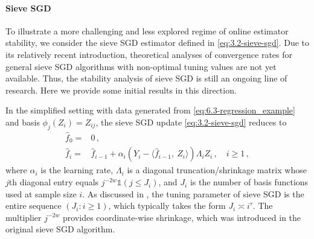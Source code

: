 \documentclass[11pt]{article}
\theoremstyle{plain}
\newcommand{\D}{{\mathcal{D}}}
\begin{document}

\paragraph{Sieve SGD}
To illustrate a more challenging and less explored regime of online estimator stability, we 
consider the sieve SGD estimator defined in \eqref{eq:3.2-sieve-sgd}.  Due to its relatively recent introduction, theoretical analyses of convergence rates for general sieve SGD algorithms with non-optimal tuning values are not yet available. Thus, the stability analysis of sieve SGD is still an ongoing line of research.  Here we provide some initial results in this direction.

In the
simplified setting with data generated from \eqref{eq:6.3-regression_example} and basis $\phi_j(Z_i)=Z_{ij}$, the sieve SGD update \eqref{eq:3.2-sieve-sgd} reduces to
\begin{align}
    \hat f_0 = &0\,,\nonumber\\
    \hat f_{i} = & \hat f_{i-1} + \alpha_i (Y_i-\langle \hat f_{i-1},~Z_i\rangle) \Lambda_i Z_i\,,\quad i\ge 1\,,\label{eq:6.4-sieve-sgd-simple}
\end{align}
where $\alpha_i$ is the learning rate, $\Lambda_i$ is a diagonal truncation/shrinkage matrix whose $j$th diagonal entry equals $j^{-2w}\mathds{1}(j\le J_i)$, and $J_i$ is the number of basis functions used at sample size $i$.  As discussed in , the tuning parameter of sieve SGD is the entire sequence $(J_i:i\ge 1)$, which typically takes the form $J_i\asymp i^\tau$.   The multiplier $j^{-2w}$ provides coordinate-wise shrinkage, which was introduced in the original sieve SGD algorithm.
\end{document}
